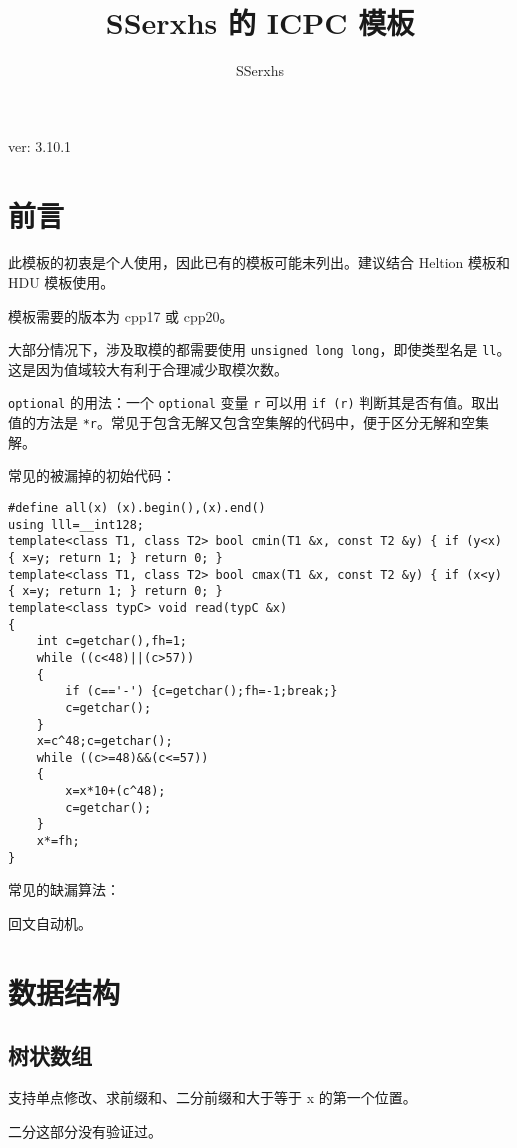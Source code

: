 \documentclass[12pt]{ctexart}
\author{SSerxhs}
\title{SSerxhs 的 ICPC 模板}
\begin{document}
\maketitle

\centerline{ver: 3.10.1}

\tableofcontents

\newpage

\section{前言}

此模板的初衷是个人使用，因此已有的模板可能未列出。建议结合 Heltion 模板和 HDU 模板使用。

模板需要的版本为 cpp17 或 cpp20。

大部分情况下，涉及取模的都需要使用 \verb|unsigned long long|，即使类型名是 \verb|ll|。这是因为值域较大有利于合理减少取模次数。

\verb|optional| 的用法：一个 \verb|optional| 变量 \verb|r| 可以用 \verb|if (r)| 判断其是否有值。取出值的方法是 \verb|*r|。常见于包含无解又包含空集解的代码中，便于区分无解和空集解。

常见的被漏掉的初始代码：
\begin{lstlisting}
#define all(x) (x).begin(),(x).end()
using lll=__int128;
template<class T1, class T2> bool cmin(T1 &x, const T2 &y) { if (y<x) { x=y; return 1; } return 0; }
template<class T1, class T2> bool cmax(T1 &x, const T2 &y) { if (x<y) { x=y; return 1; } return 0; }
template<class typC> void read(typC &x)
{
	int c=getchar(),fh=1;
	while ((c<48)||(c>57))
	{
		if (c=='-') {c=getchar();fh=-1;break;}
		c=getchar();
	}
	x=c^48;c=getchar();
	while ((c>=48)&&(c<=57))
	{
		x=x*10+(c^48);
		c=getchar();
	}
	x*=fh;
}
\end{lstlisting}

常见的缺漏算法：

回文自动机。

\newpage

\section{数据结构}

\subsection{树状数组}

支持单点修改、求前缀和、二分前缀和大于等于 x 的第一个位置。

二分这部分没有验证过。
\end{document}
